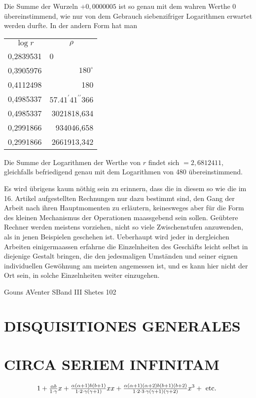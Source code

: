 \documentclass[twoside,12pt, showframe]{memoir}
\let\oldfrac\frac
\def\frac#1#2{\mathchoice{\tfrac{#1}{#2}}{\oldfrac{#1}{#2}}{\genfrac{}{}{}{2}{#1}{#2\mathstrut}}{\genfrac{}{}{}{3}{#1}{#2\mathstrut}}}
\begin{document}
Die Summe der Wurzeln \(+0,0000005\) ist so genau mit dem wahren Werthe 0 übereinstimmend, wie nur von dem Gebrauch siebenzifriger Logarithmen erwartet werden durfte. In der andern Form hat man

\begin{center}
\begin{tabular}{c|r}
\(\log r\) & \multicolumn{1}{|c}{\(\rho\)} \\
\cline { 2 - 2 }
0,2839531 & \multicolumn{1}{|l}{0} \\
0,3905976 & \(180^{\circ}\) \\
0,4112498 & 180 \\
0,4985337 & \(57.41^{\prime} 41^{\prime \prime} 366\) \\
0,4985337 & 3021818,634 \\
0,2991866 & 934046,658 \\
0,2991866 & 2661913,342 \\
\end{tabular}
\end{center}

Die Summe der Logarithmen der Werthe von \(r\) findet sich \(=2,6812411\), gleichfalls befriedigend genau mit dem Logarithmen von 480 übereinstimmend.

Es wird übrigens kaum nöthig sein zu erinnern, dass die in diesem so wie die im 16. Artikel aufgestellten Rechnungen nur dazu bestimmt sind, den Gang der Arbeit nach ihren Hauptmomenten zu erläutern, keinesweges aber für die Form des kleinen Mechanismus der Operationen maassgebend sein sollen. Geübtere Rechner werden meistens vorziehen, nicht so viele Zwischenstufen anzuwenden, als in jenen Beispielen geschehen ist. Ueberhaupt wird jeder in dergleichen Arbeiten einigermaassen erfahrne die Einzelnheiten des Geschäfts leicht selbst in diejenige Gestalt bringen, die den jedesmaligen Umständen und seiner eignen individuellen Gewöhnung am meisten angemessen ist, und es kann hier nicht der Ort sein, in solche Einzelnheiten weiter einzugehen.

\begin{center}
\end{center}

Gouns AVenter SBand III Shetes 102

\section*{DISQUISITIONES GENERALES}
\section*{CIRCA SERIEM INFINITAM}
\[
1+\frac{\alpha b}{1 \cdot \gamma} x+\frac{\alpha(\alpha+1) b(b+1)}{1 \cdot 2 \cdot \gamma(\gamma+1)} x x+\frac{\alpha(\alpha+1)(\alpha+2) b(b+1)(b+2)}{1 \cdot 2 \cdot 3 \cdot \gamma(\gamma+1)(\gamma+2)} x^{3}+\text { etc. }
\]
\end{document}
